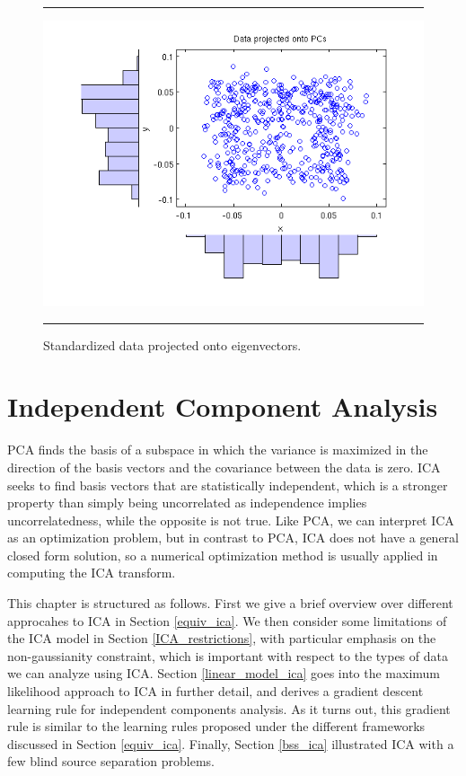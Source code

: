 \documentclass[11pt, oneside, a4paper]{report}
\begin{document}
\begin{figure}
  \centering
  \hrule
  \includegraphics[width = .9\textwidth]{Figures/pca_eig_projection}
  \hrule
  \caption{Standardized data projected onto eigenvectors.}
\end{figure}





\chapter{Independent Component Analysis}\label{ica}


PCA finds the basis of a subspace in which the variance is
maximized in the direction of the basis vectors and the covariance
between the data is zero. ICA seeks to find basis
vectors that are statistically independent, which is a stronger
property than simply being uncorrelated as independence implies
uncorrelatedness, while the opposite is not true. 
Like PCA, we can interpret ICA as an optimization problem, but in
contrast to PCA, ICA does not have a general closed form solution, 
so a numerical optimization method is usually applied in
computing the ICA transform.

This chapter is structured as follows. First we give a brief overview
over different approcahes to ICA in Section \ref{equiv_ica}. We then 
consider some limitations of the ICA model in Section \ref{ICA_restrictions}, 
with particular emphasis on the non-gaussianity constraint, which is 
important with respect to the types of data we can analyze using ICA. Section 
\ref{linear_model_ica} goes into the maximum likelihood approach to ICA in 
further detail, and derives a gradient descent learning rule for independent
components analysis. As it turns out, this gradient rule is similar to the 
learning rules proposed under the different frameworks discussed in 
Section \ref{equiv_ica}. Finally, Section \ref{bss_ica} illustrated ICA 
with a few blind source separation problems.
\end{document}
